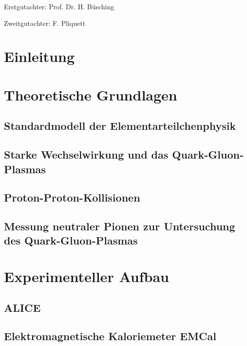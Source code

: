 \documentclass[a4paper,11pt,twoside]{report}
\author{Marvin Hemmer}
\renewcommand{\,}{,\!} %
\begin{document}
\begin{titlepage}
\begin{center}

\end{center}
\end{titlepage}
\newpage
\thispagestyle{empty}
\vspace*{\fill}
Erstgutachter: Prof. Dr. H. Büsching

Zweitgutachter: F. Pliquett
\newpage
\clearpage
\setcounter{page}{1}
\tableofcontents

\chapter*{Einleitung}

\chapter{Theoretische Grundlagen} \label{s1}

\section{Standardmodell der Elementarteilchenphysik} \label{s1s1}


\section{Starke Wechselwirkung und das Quark-Gluon-Plasmas} \label{s1s2}

\section{Proton-Proton-Kollisionen}\label{s1s3}


\section{Messung neutraler Pionen zur Untersuchung des Quark-Gluon-Plasmas} \label{s1s4}


\chapter{Experimenteller Aufbau} \label{s2}

\section{ALICE} \label{s2s1}

\section{Elektromagnetische Kaloriemeter EMCal} \label{s2s2}

\end{document}
